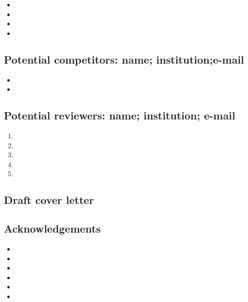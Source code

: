 \documentclass[11pt,letterpaper]{article}
\begin{document}
\begin{itemize}
\item 

\item 

\item 

\item 
\end{itemize}

\subsection{Potential competitors: name; institution;e-mail}
\label{sec:org28c9604}


\begin{itemize}
\item 

\item 
\end{itemize}

\subsection{Potential reviewers: name; institution; e-mail}
\label{sec:orgaf6e027}


\begin{enumerate}
\item 

\item 

\item 

\item 

\item 
\end{enumerate}

\subsection{Draft cover letter}
\label{sec:orgf22027a}



\subsection{Acknowledgements}
\label{sec:org5ebeedd}


\begin{itemize}
\item 

\item 

\item 

\item 

\item 

\item 
\end{itemize}
\end{document}
